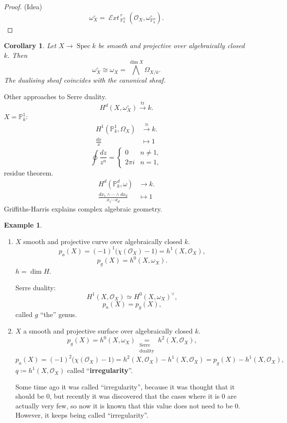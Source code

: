 \documentclass[12pt]{article}
\DeclareMathOperator{\Spec}{Spec}
\DeclareMathOperator{\shExt}{\mathcal{E}\textit{xt}\,}
\DeclareMathOperator{\tr}{tr}
\newtheorem*{corollary}{Corollary}
\theoremstyle{definition}
\newtheorem*{example}{Example}
\begin{document}
\begin{proof}
(Idea)
\[\omega_X^{\circ}=\shExt_{\mathbb{P}_k^n}^r(\mathcal{O}_X,\omega_{\mathbb{P}_k^n}^{\circ}).\]
\end{proof}

\begin{corollary}
Let $X\rightarrow\Spec k$ be smooth and projective over algebraically closed $k$. Then
\[\omega_X^{\circ}\cong\omega_X={\bigwedge}^{\dim X}\Omega_{X/k}.\]
The dualising sheaf coincides with the canonical sheaf.
\end{corollary}

Other approaches to Serre duality.
\[H^d(X,\omega_X^{\circ})\overset{\tr}{\longrightarrow}k.\]
$X=\mathbb{P}_k^1$:
\begin{align*}
H^1(\mathbb{P}_k^1,\Omega_X)&\overset{\cong}{\longrightarrow}k.\\
\frac{dx}{x}&\longmapsto1
\end{align*}
\[\oint\frac{dz}{z^n}=\left\{\begin{array}{ll}0&n\neq1,\\2\pi i&n=1,\end{array}\right.\]
residue theorem.
\begin{align*}
H^d(\mathbb{P}_k^d,\omega)&\longrightarrow k.\\
\frac{dx_1\wedge\cdots\wedge dx_d}{x_1\cdots x_d}&\longmapsto1
\end{align*}
Griffiths-Harris \cite{griffiths2014principles} explains complex algebraic geometry.

\begin{example}
\begin{enumerate}[label=\arabic*)]
\item $X$ smooth and projective curve over algebraically closed $k$.
\[p_a(X)=(-1)^1\big(\chi(\mathcal{O}_X)-1\big)=h^1(X,\mathcal{O}_X),\]
\[p_g(X)=h^0(X,\omega_X).\]
$h=\dim H$.

Serre duality:
\[H^1(X,\mathcal{O}_X)\simeq H^0(X,\omega_X)^{\vee},\]
\[p_a(X)=p_g(X),\]
called $g$ ``the'' genus.

\item $X$ a smooth and projective surface over algebraically closed $k$.
\[p_g(X)=h^0(X,\omega_X)\underset{\substack{\text{Serre}\\\text{duality}}}{=}h^2(X,\mathcal{O}_X),\]
\[p_a(X)=(-1)^2\big(\chi(\mathcal{O}_X)-1\big)=h^2(X,\mathcal{O}_X)-h^1(X,\mathcal{O}_X)=p_g(X)-h^1(X,\mathcal{O}_X),\]
$q\coloneqq h^1(X,\mathcal{O}_X)$ called ``\textbf{irregularity}''.

Some time ago it was called ``irregularity'', because it was thought that it should be $0$, but recently it was discovered that the cases where it is $0$ are actually very few, so now it is known that this value does not need to be $0$. However, it keeps being called ``irregularity''.
\end{enumerate}
\end{example}
\end{document}
